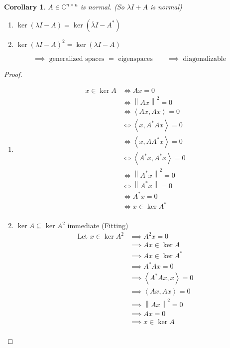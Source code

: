 \documentclass[a4paper]{article}
\newcounter{lecref}[section]
\numberwithin{lecref}{section}
\newtheorem{corollary}[lecref]{Corollary}
\newcommand{\angel}[1]{\left\langle#1\right\rangle}
\newcommand{\norm}[1]{\left\|#1\right\|}
\begin{document}
\begin{corollary} %
  \label{cor125}
  $A \in \mathbb C^{n \times n}$ is normal. (So $\lambda I + A$ is normal)
  \begin{enumerate}
    \item $\ker(\lambda I - A) = \ker(\overline{\lambda} I - A^*)$
    \item $\ker(\lambda I - A)^2 = \ker(\lambda I - A)$
  \end{enumerate}
  \[ \implies \text{ generalized spaces } = \text{ eigenspaces} \qquad \implies \text{ diagonalizable} \]
\end{corollary}

\begin{proof}
  \begin{enumerate}
    \item
      \begin{align*}
        x \in \ker{A} &\iff Ax = 0 \\
          &\iff \norm{Ax}^2 = 0 \\
          &\iff \angel{Ax, Ax} = 0 \\
          &\iff \angel{x, A^* Ax} = 0 \\
          &\iff \angel{x, AA^* x} = 0 \\
          &\iff \angel{A^* x, A^* x} = 0 \\
          &\iff \norm{A^* x}^2 = 0 \\
          &\iff \norm{A^* x} = 0 \\
          &\iff A^* x = 0 \\
          &\iff x \in \ker{A^*} \\
      \end{align*}
    \item $\ker{A} \subseteq \ker{A^2}$ immediate (Fitting)
      \begin{align*}
        \text{Let } x \in \ker{A^2}
          &\implies A^2 x = 0 \\
          &\implies Ax \in \ker{A} \\
          &\implies Ax \in \ker{A^*} \\
          &\implies A^* Ax = 0 \\
          &\implies \angel{A^* Ax, x} = 0 \\
          &\implies \angel{Ax, Ax} = 0 \\
          &\implies \norm{Ax}^2 = 0 \\
          &\implies Ax = 0 \\
          &\implies x \in \ker{A} \\
      \end{align*}
  \end{enumerate}
\end{proof}
\end{document}
